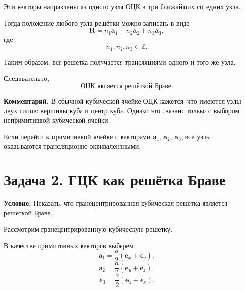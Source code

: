 \documentclass[../final.tex]{subfiles}
\begin{document}
Эти векторы направлены из одного узла ОЦК
в три ближайших соседних узла.

Тогда положение любого узла решётки можно записать в виде
%
\begin{equation*}
    \boxed{
        \mathbf R
        =
        n_1\mathbf a_1
        +
        n_2\mathbf a_2
        +
        n_3\mathbf a_3
    },
\end{equation*}
%
где
%
\begin{equation*}
    n_1,n_2,n_3\in\mathbb Z.
\end{equation*}

Таким образом, вся решётка получается трансляциями
одного и того же узла.

Следовательно,
%
\begin{equation*}
    \boxed{
        \text{ОЦК является решёткой Браве.}
    }
\end{equation*}

\textbf{Комментарий.}
В обычной кубической ячейке ОЦК кажется, что имеются узлы
двух типов: вершины куба и центр куба. Однако это связано
только с выбором непримитивной кубической ячейки.

Если перейти к примитивной ячейке с векторами
$\mathbf a_1$, $\mathbf a_2$, $\mathbf a_3$, все узлы
оказываются трансляционно эквивалентными.



\section{Задача 2. ГЦК как решётка Браве}

\textbf{Условие.}
Показать, что гранецентрированная кубическая решётка
является решёткой Браве.


%
%


Рассмотрим гранецентрированную кубическую решётку.

В качестве примитивных векторов выберем
%
\begin{equation*}
    \mathbf a_1
    =
    \frac{a}{2}
    \left(
        \mathbf e_x+\mathbf e_y
    \right),
\end{equation*}
%
\begin{equation*}
    \mathbf a_2
    =
    \frac{a}{2}
    \left(
        \mathbf e_y+\mathbf e_z
    \right),
\end{equation*}
%
\begin{equation*}
    \mathbf a_3
    =
    \frac{a}{2}
    \left(
        \mathbf e_z+\mathbf e_x
    \right).
\end{equation*}
\end{document}
